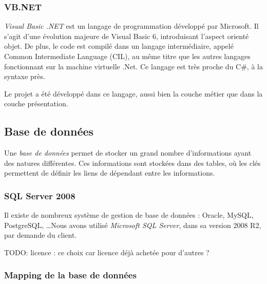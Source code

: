 
\subsubsection{VB.NET}

\textit{Visual Basic .NET} est un langage de programmation développé par Microsoft. Il s'agit d'une évolution majeure de Visual Basic 6, introduisant l'aspect orienté objet. De plus, le code est compilé dans un langage intermédiaire, appelé Common Intermediate Language (CIL), au même titre que les autres langages fonctionnant sur la machine virtuelle .Net. Ce langage est très proche du C\#, à la syntaxe près.

Le projet a été développé dans ce langage, aussi bien la couche métier que dans la couche présentation.


\subsection{Base de données}

Une \textit{base de données} permet de stocker un grand nombre d'informations ayant des natures différentes. Ces informations sont stockées dans des tables, où les clés permettent de définir les liens de dépendant entre les informations.


\subsubsection{SQL Server 2008}

Il existe de nombreux système de gestion de base de données : Oracle, MySQL, PostgreSQL, \ldots Nous avons utilisé \textit{Microsoft SQL Server}, dans sa version 2008 R2, par demande du client.

TODO: licence : ce choix car licence déjà achetée pour d'autres ?


\subsubsection{Mapping de la base de données}


